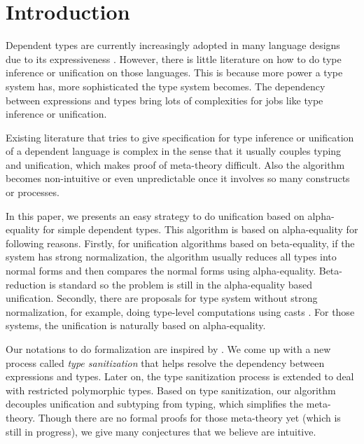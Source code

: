 \section{Introduction}

Dependent types are currently increasingly adopted in many language
designs due to its expressiveness \cite{xi1999dependent, licata2005formulation,
  pasalic2006concoqtion, mckinna2006dependent,
  norell2009dependently, brady2013idris}.
However, there is little literature on
how to do type inference or unification on those languages. This is because
more power a type system has, more sophisticated the type system
becomes. The dependency between expressions and types bring lots of complexities
for jobs like type inference or unification.

Existing literature \cite{ziliani2015unification}
that tries to give specification for type inference
or unification of
a dependent language is complex in the sense that it usually couples typing
and unification, which makes proof of meta-theory difficult.
Also the algorithm becomes non-intuitive or even unpredictable once it involves
so many constructs or processes.

In this paper, we presents an easy strategy to do unification based on
alpha-equality for simple dependent
types. This algorithm is based on alpha-equality for following reasons. Firstly,
for unification algorithms based on beta-equality, if the system has strong
normalization, the algorithm usually reduces all types into normal forms and
then compares the normal forms using
alpha-equality. Beta-reduction is standard so the problem is still in the
alpha-equality based unification.
Secondly, there are proposals for type system without strong
normalization, for example, doing type-level computations using casts
\cite{van2013explicit, kimmell2012equational, sjoberg2012irrelevance}
. For
those systems, the unification is naturally based on alpha-equality.

Our notations to do formalization are inspired by \cite{dunfield2013complete}.
We come up with a new
process called \textit{type sanitization} that helps resolve the dependency
between expressions and types. Later on, the type sanitization process is
extended to deal with restricted polymorphic types.
Based on type sanitization, our algorithm
decouples unification and subtyping from typing, which simplifies the
meta-theory. Though there are no formal proofs for those meta-theory yet (which
is still in progress),
we give many conjectures that we believe are intuitive.

